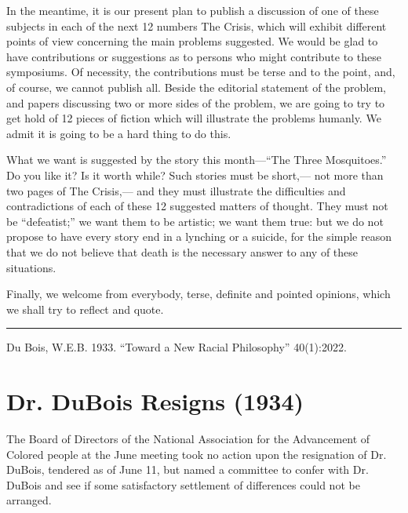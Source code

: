 \documentclass[letterpaper,10pt,english]{jupyterBook}
\begin{document}
\sphinxAtStartPar
In the meantime, it is our present plan to publish a discussion of one of these subjects in each of the next 12 numbers The Crisis, which will exhibit different points of view concerning the main problems suggested. We would be glad to have contributions or suggestions as to persons who might contribute to these symposiums. Of necessity, the contributions must be terse and to the point, and, of course, we cannot publish all. Beside the editorial statement of the problem, and papers discussing two or more sides of the problem, we are going to try to get hold of 12 pieces of fiction which will illustrate the problems humanly. We admit it is going to be a hard thing to do this.

\sphinxAtStartPar
What we want is suggested by the story this month—“The Three Mosquitoes.” Do you like it? Is it worth while? Such stories must be short,— not more than two pages of The Crisis,— and they must illustrate the difficulties and contradictions of each of these 12 suggested matters of thought. They must not be “defeatist;” we want them to be artistic; we want them true: but we do not propose to have every story end in a lynching or a suicide, for the simple reason that we do not believe that death is the necessary answer to any of these situations.

\sphinxAtStartPar
Finally, we welcome from everybody, terse, definite and pointed opinions, which we shall try to reflect and quote.


\bigskip\hrule\bigskip


\sphinxAtStartPar
{} Du Bois, W.E.B. 1933. “Toward a New Racial Philosophy”  40(1):20\sphinxhyphen{}22.


\section{Dr. DuBois Resigns (1934)}
\label{\detokenize{Volumes/41/08/dr_dubois_resigns:dr-dubois-resigns-1934}}\label{\detokenize{Volumes/41/08/dr_dubois_resigns::doc}}
\sphinxAtStartPar
{}

\sphinxAtStartPar
The Board of Directors of the National Association for the Advancement of Colored people at the June meeting took no action upon the resignation of Dr. DuBois, tendered as of June 11, but named a committee to confer with Dr. DuBois and see if some satisfactory settlement of differences could not be arranged.
\end{document}

